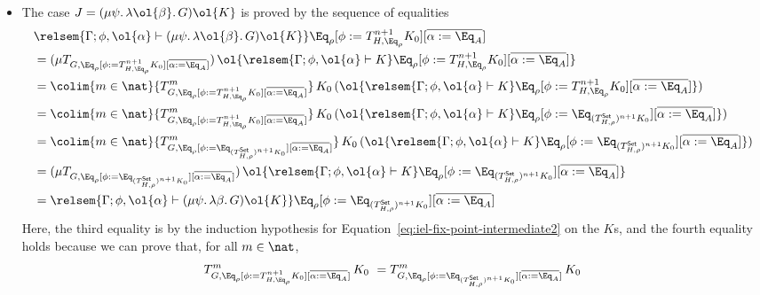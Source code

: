 \documentclass{lmcs}
\theoremstyle{plain}\newtheorem{satz}[thm]{Satz}
\newcommand{\set}{\mathsf{Set}}
\begin{document}
\begin{itemize}
\begin{itemize}
\item 
  The case $J = (\mu \psi.\, \lambda \ol{\beta}.\, G) \ol{K}$
is proved by the sequence of equalities 
\[
\begin{split}
& \relsem{\Gamma; \phi, \ol{\alpha} \vdash (\mu \psi.\, \lambda
    \ol{\beta}.\, G) \ol{K}} 
  \Eq_{\rho} [\phi := T^{n+1}_{H,\Eq_{\rho}} K_0]
  [\overline{\alpha := \Eq_A}] \\
&= (\mu {T_{G, \Eq_{\rho}[\phi := T^{n+1}_{H,\Eq_{\rho}} K_0][\overline{\alpha := \Eq_A}]}})
  \,\ol{\relsem{\Gamma; \phi, \ol{\alpha} \vdash K}\Eq_{\rho}
  [\phi := T^{n+1}_{H,\Eq_{\rho}} K_0][\overline{\alpha := \Eq_A}]} \\ 
&= \colim{m \in \nat} {T^m_{G, \Eq_{\rho}[\phi := T^{n+1}_{H,\Eq_{\rho}} K_0][\overline{\alpha := \Eq_A}]}}\,K_0
  \,(\ol{\relsem{\Gamma; \phi, \ol{\alpha} \vdash K}\Eq_{\rho}
  [\phi := T^{n+1}_{H,\Eq_{\rho}} K_0][\overline{\alpha := \Eq_A}]}) \\ 
&= \colim{m \in \nat} {T^m_{G, \Eq_{\rho}[\phi := T^{n+1}_{H,\Eq_{\rho}} K_0][\overline{\alpha := \Eq_A}]}}\,K_0
  \,(\ol{\relsem{\Gamma; \phi, \ol{\alpha} \vdash K}\Eq_{\rho}
  [\phi := \Eq_{(T^{\set}_{H,\rho})^{n+1} K_0}][\overline{\alpha := \Eq_A}]}) \\  %
&= \colim{m \in \nat} {T^m_{G, \Eq_{\rho}[\phi := \Eq_{(T^{\set}_{H,\rho})^{n+1} K_0}][\overline{\alpha := \Eq_A}]}}\,K_0
  \,(\ol{\relsem{\Gamma; \phi, \ol{\alpha} \vdash K}\Eq_{\rho}
  [\phi := \Eq_{(T^{\set}_{H,\rho})^{n+1} K_0}][\overline{\alpha := \Eq_A}]}) \\ 
&= (\mu {T_{G, \Eq_{\rho}[\phi := \Eq_{(T^{\set}_{H,\rho})^{n+1} K_0}][\overline{\alpha := \Eq_A}]}})
  \,\ol{\relsem{\Gamma; \phi, \ol{\alpha} \vdash K}\Eq_{\rho}
  [\phi := \Eq_{(T^{\set}_{H,\rho})^{n+1} K_0}][\overline{\alpha := \Eq_A}]} \\ 
&= \relsem{\Gamma; \phi, \ol{\alpha} \vdash (\mu \psi.\, \lambda \beta.\, G) \ol{K}}
  \Eq_{\rho}[\phi := \Eq_{(T^{\set}_{H,\rho})^{n+1} K_0}][\overline{\alpha := \Eq_{A}}]
\end{split}
\]
Here, the third equality is by the induction hypothesis for
Equation~\ref{eq:iel-fix-point-intermediate2} on the $K$s, and the
fourth equality holds because we can prove that, for all $m \in \nat$,
\begin{equation}\label{eq:helper}
T^m_{G,
\Eq_{\rho}[\phi := T^{n+1}_{H,\Eq_{\rho}} K_0][\overline{\alpha :=
    \Eq_A}]}\,K_0 \ = T^m_{G, \Eq_{\rho}[\phi :=
    \Eq_{(T^{\set}_{H,\rho})^{n+1} K_0}][\overline{\alpha :=
      \Eq_A}]}\,K_0
\end{equation}

\end{itemize}
\end{itemize}
\end{document}
